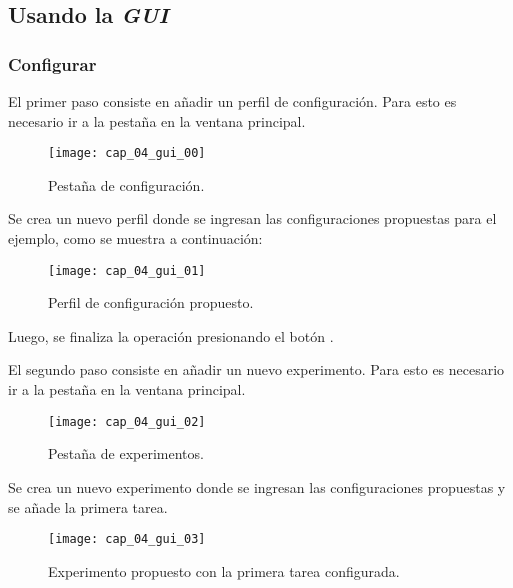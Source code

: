 \documentclass[\main/main.tex]{subfiles}
\begin{document}
        \newpage
        \subsection{Usando la \textit{GUI}}
            \subsubsection{Configurar}
                El primer paso consiste en añadir un perfil de configuración. Para esto es necesario ir a la pestaña  en la ventana principal.
                \begin{figure}[H]
                    \centering
                    \texttt{[image: cap\_04\_gui\_00]}
                    \caption{Pestaña de configuración.}
                    \label{fig:04_gui_conf00}
                \end{figure}

                Se crea un nuevo perfil donde se ingresan las configuraciones propuestas para el ejemplo, como se muestra a continuación:
                \begin{figure}[H]
                    \centering
                    \texttt{[image: cap\_04\_gui\_01]}
                    \caption{Perfil de configuración propuesto.}
                    \label{fig:04_gui_conf01}
                \end{figure}

                Luego, se finaliza la operación presionando el botón .

                \newpage
                El segundo paso consiste en añadir un nuevo experimento. Para esto es necesario ir a la pestaña  en la ventana principal.
                \begin{figure}[H]
                    \centering
                    \texttt{[image: cap\_04\_gui\_02]}
                    \caption{Pestaña de experimentos.}
                    \label{fig:04_gui_exp01}
                \end{figure} 

                Se crea un nuevo experimento donde se ingresan las configuraciones propuestas y se añade la primera tarea.
                \begin{figure}[H]
                    \centering
                    \texttt{[image: cap\_04\_gui\_03]}
                    \caption{Experimento propuesto con la primera tarea configurada.}
                    \label{fig:04_gui_exp02}
                \end{figure} 
\end{document}
